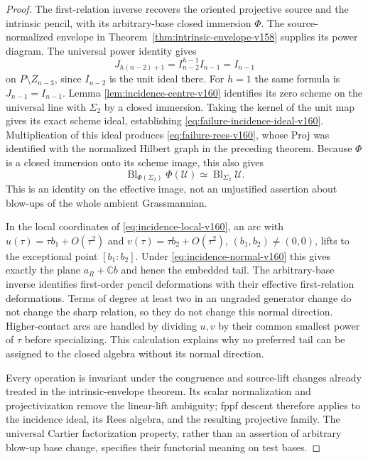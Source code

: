 \documentclass[11pt,reqno]{amsart}
\numberwithin{equation}{section}
\theoremstyle{definition}\newtheorem{definition}[theorem]{Definition}
\theoremstyle{remark}\newtheorem{remark}[theorem]{Remark}
\newcommand{\C}{\mathbb C}\newcommand{\Q}{\mathbb Q}
\begin{document}
\begin{proof}
The first-relation inverse recovers the oriented projective source
and the intrinsic pencil, with its arbitrary-base closed immersion
$\Phi$. The source-normalized envelope in
Theorem~\ref{thm:intrinsic-envelope-v158} supplies its power diagram.
The universal power identity gives
\[
 J_{h(n-2)+1}=I_{n-2}^{h-1}I_{n-1}=I_{n-1}
\]
on $P\setminus Z_{n-3}$, since $I_{n-2}$ is the unit ideal there.
For $h=1$ the same formula is $J_{n-1}=I_{n-1}$. Lemma
\ref{lem:incidence-centre-v160} identifies its zero scheme on the
universal line with $\Sigma_2$ by a closed immersion. Taking the
kernel of the unit map gives its exact scheme ideal, establishing
\eqref{eq:failure-incidence-ideal-v160}. Multiplication of this
ideal produces \eqref{eq:failure-rees-v160}, whose Proj was identified
with the normalized Hilbert graph in the preceding theorem. Because
$\Phi$ is a closed immersion onto its scheme image, this also gives
\[
 \operatorname{Bl}_{\Phi(\Sigma_2)}\Phi(\mathcal U)
                 \simeq\operatorname{Bl}_{\Sigma_2}\mathcal U.
\]
This is an identity on the effective image, not an unjustified
assertion about blow-ups of the whole ambient Grassmannian.

In the local coordinates of \eqref{eq:incidence-local-v160}, an arc
with $u(\tau)=\tau b_1+O(\tau^2)$ and
$v(\tau)=\tau b_2+O(\tau^2)$, $(b_1,b_2)\ne(0,0)$, lifts to the
exceptional point $[b_1:b_2]$. Under
\eqref{eq:incidence-normal-v160} this gives exactly the plane
$a_R+\C b$ and hence the embedded tail. The arbitrary-base inverse
identifies first-order pencil deformations with their effective
first-relation deformations. Terms of degree at least two in an
ungraded generator change do not change the sharp relation, so they
do not change this normal direction. Higher-contact arcs are handled
by dividing $u,v$ by their common smallest power of $\tau$ before
specializing. This calculation explains why no preferred tail can
be assigned to the closed algebra without its normal direction.

Every operation is invariant under the congruence and source-lift
changes already treated in the intrinsic-envelope theorem. Its scalar
normalization and projectivization remove the linear-lift ambiguity;
fppf descent therefore applies to the incidence ideal, its Rees
algebra, and the resulting projective family. The universal Cartier
factorization property, rather than an assertion of arbitrary
blow-up base change, specifies their functorial meaning on test bases.
\end{proof}
\end{document}
